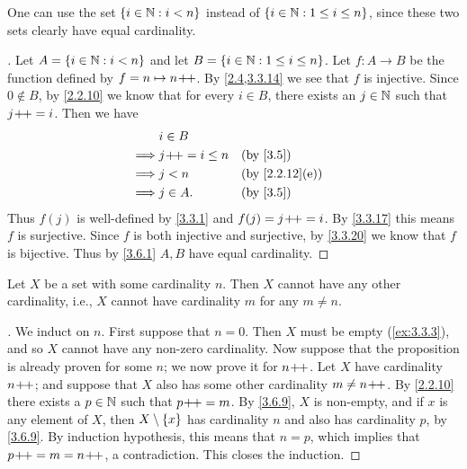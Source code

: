\begin{rmk}\label{3.6.6}
	One can use the set \(\left\lbrace i \in \mathbb{N} : i < n\right\rbrace\) instead of \(\left\lbrace i \in \mathbb{N} : 1 \leq i \leq n\right\rbrace\), since these two sets clearly have equal cardinality.
\end{rmk}

\begin{proof}[]
	Let \(A = \left\lbrace i \in \mathbb{N} : i < n\right\rbrace\) and let \(B = \left\lbrace i \in \mathbb{N} : 1 \leq i \leq n\right\rbrace\).
	Let \(f : A \to B\) be the function defined by \(f = n \mapsto n\!+\!\!+\).
	By \cref{2.4,3.3.14} we see that \(f\) is injective.
	Since \(0 \notin B\), by \cref{2.2.10} we know that for every \(i \in B\), there exists an \(j \in \mathbb{N}\) such that \(j\!+\!\!+ = i\).
	Then we have
	\begin{align*}
		         & i \in B                             \\
		\implies & j\pp = i \leq n &  & \by{3.5}       \\
		\implies & j < n           &  & \by{2.2.12}[e] \\
		\implies & j \in A.        &  & \by{3.5}
	\end{align*}
	Thus \(f(j)\) is well-defined by \cref{3.3.1} and \(f(j) = j\!+\!\!+ = i\).
	By \cref{3.3.17} this means \(f\) is surjective.
	Since \(f\) is both injective and surjective, by \cref{3.3.20} we know that \(f\) is bijective.
	Thus by \cref{3.6.1} \(A, B\) have equal cardinality.
\end{proof}

\setcounter{thm}{7}
\begin{prop}\label{3.6.8}
	Let \(X\) be a set with some cardinality \(n\).
	Then \(X\) cannot have any other cardinality, i.e., \(X\) cannot have cardinality \(m\) for any \(m \neq n\).
\end{prop}

\begin{proof}[]
	We induct on \(n\).
	First suppose that \(n = 0\).
	Then \(X\) must be empty (\cref{ex:3.3.3}), and so \(X\) cannot have any non-zero cardinality.
	Now suppose that the proposition is already proven for some \(n\);
	we now prove it for \(n\!+\!\!+\).
	Let \(X\) have cardinality \(n\!+\!\!+\);
	and suppose that \(X\) also has some other cardinality \(m \neq n\!+\!\!+\).
	By \cref{2.2.10} there exists a \(p \in \mathbb{N}\) such that \(p\!+\!\!+ = m\).
	By \cref{3.6.9}, \(X\) is non-empty, and if \(x\) is any element of \(X\), then \(X \setminus \left\lbrace x\right\rbrace\) has cardinality \(n\) and also has cardinality \(p\), by \cref{3.6.9}.
	By induction hypothesis, this means that \(n = p\), which implies that \(p\!+\!\!+ = m = n\!+\!\!+\), a contradiction.
	This closes the induction.
\end{proof}


